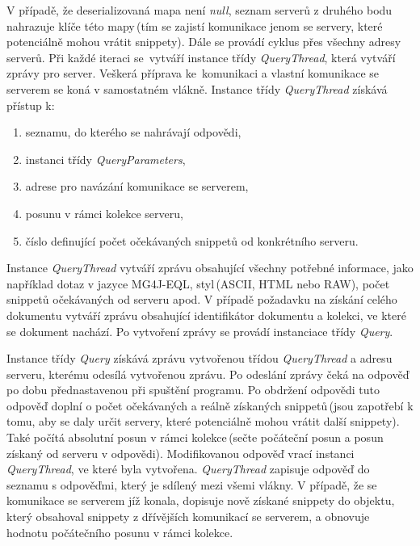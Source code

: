 V případě, že deserializovaná mapa není \emph{null}, seznam serverů z druhého bodu nahrazuje klíče této mapy\,(tím se zajistí komunikace jenom se servery, které potenciálně mohou vrátit snippety). Dále se provádí cyklus přes všechny adresy serverů. Při každé iteraci se~vytváří instance třídy  \emph{QueryThread}, která vytváří zprávy pro server. Veškerá příprava ke~komunikaci a vlastní komunikace se serverem se koná v samostatném vlákně. Instance třídy \emph{QueryThread} získává přístup k:
\begin{enumerate}
\item seznamu, do kterého se nahrávají odpovědi,

\item instanci třídy \emph{QueryParameters},

\item adrese pro navázání komunikace se serverem,

\item posunu v rámci kolekce serveru,

\item číslo definující počet očekávaných snippetů od konkrétního serveru.
\end{enumerate}

Instance \emph{QueryThread} vytváří zprávu obsahující všechny potřebné informace, jako například dotaz v jazyce MG4J-EQL, styl\,(ASCII, HTML nebo RAW), počet snippetů očekávaných od serveru apod. V případě požadavku na získání celého dokumentu vytváří zprávu obsahující identifikátor dokumentu a kolekci, ve které se dokument nachází. Po vytvoření zprávy se provádí instanciace třídy \emph{Query}.

Instance třídy \emph{Query} získává zprávu vytvořenou třídou \emph{QueryThread} a adresu serveru, kterému  odesílá vytvořenou zprávu. Po odeslání zprávy čeká na odpověď po dobu přednastavenou při spuštění programu. Po obdržení odpovědi tuto odpověď doplní o počet očekávaných a reálně získaných snippetů\,(jsou zapotřebí k tomu, aby se daly určit servery, které potenciálně mohou vrátit další snippety). Také počítá absolutní posun v rámci kolekce\,(sečte počáteční posun a posun získaný od serveru v odpovědi).  Modifikovanou odpověď vrací instanci \emph{QueryThread}, ve které byla vytvořena. \emph{QueryThread} zapisuje odpověď do seznamu s odpověďmi, který je sdílený mezi všemi vlákny. V případě, že se komunikace se serverem jíž konala, dopisuje nově získané snippety do objektu, který obsahoval snippety z dřívějších komunikací se serverem, a obnovuje hodnotu počátečního posunu v rámci kolekce.

